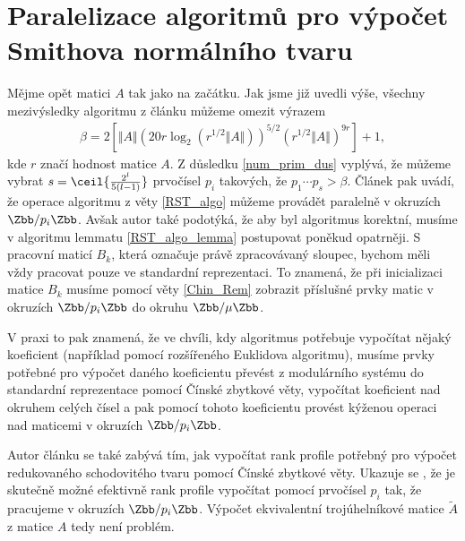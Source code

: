 \section{Paralelizace algoritmů pro výpočet Smithova normálního tvaru}
Mějme opět matici $ A $ tak jako na začátku. Jak jsme již uvedli výše, všechny
mezivýsledky algoritmu z článku \cite{triang} můžeme omezit výrazem
\begin{align*}
    \beta = 2[\Vert A \Vert (20 r \log_2{ (r^{1/2} \Vert A \Vert) })^{5/2} (r^{1/2} \Vert A \Vert)^{9 r} ] + 1 ,
\end{align*}
kde $ r $ značí hodnost matice $ A $. Z důsledku \ref{num_prim_dus} vyplývá, že 
můžeme vybrat $ s = \ceil{\frac{2^{l}}{5 (l - 1)}} $ prvočísel $ p_i $ takových,
že $ p_1 \cdots p_s > \beta $. Článek \cite[Theorem 16]{triang} pak
uvádí, že operace algoritmu z věty \ref{RST_algo} můžeme provádět paralelně
v okruzích $ \Zbb / p_i \Zbb $. Avšak autor také podotýká, že aby byl algoritmus
korektní, musíme v algoritmu lemmatu \ref{RST_algo_lemma} postupovat poněkud
opatrněji. S pracovní maticí $ B_k $, která označuje právě zpracovávaný sloupec,
bychom měli vždy pracovat pouze ve standardní reprezentaci. To znamená, že při
inicializaci matice $ B_k $ musíme pomocí věty \ref{Chin_Rem} zobrazit příslušné
prvky matic v okruzích $ \Zbb / p_i \Zbb $ do okruhu $ \Zbb / \mu \Zbb $.

V praxi to pak znamená, že ve chvíli, kdy algoritmus potřebuje vypočítat nějaký
koeficient (například pomocí rozšířeného Euklidova algoritmu), musíme prvky
potřebné pro výpočet daného koeficientu převést z modulárního systému do standardní
reprezentace pomocí Čínské zbytkové věty, vypočítat koeficient nad okruhem celých
čísel a pak pomocí tohoto koeficientu provést kýženou operaci nad maticemi v
okruzích $ \Zbb / p_i \Zbb $.

Autor článku \cite{triang} se
také zabývá tím, jak vypočítat rank profile potřebný pro výpočet redukovaného
schodovitého tvaru pomocí Čínské zbytkové věty. Ukazuje se \cite[Theorem 15]{triang},
že je skutečně možné efektivně rank profile vypočítat pomocí prvočísel $ p_i $
tak, že pracujeme v okruzích $ \Zbb / p_i \Zbb $.
Výpočet ekvivalentní trojúhelníkové matice $ \tilde{A} $ z matice $ A $ tedy 
není problém.

